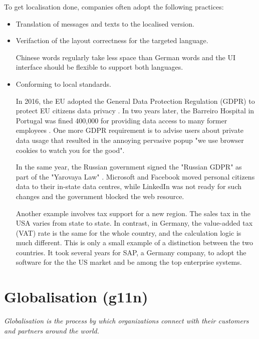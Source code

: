 To get localisation done, companies often adopt the following practices:
\begin{itemize}
  \item Translation of messages and texts to the localised version.
  \item Verifaction of the layout correctness for the targeted language.
  
  Chinese words regularly take less space than German words and the UI interface should be flexible to support both languages.

  \item Conforming to local standards.
  
  In 2016, the EU adopted the General Data Protection Regulation (GDPR) to protect EU citizens data privacy \cite{gdpr}. In two years later, the Barreiro Hospital in Portugal was fined 400,000 \EUR{} for providing data access to many former employees \cite{hospitalfinenews}.
  One more GDPR requirement is to advise users about private data usage that resulted in the annoying pervasive popup "we use browser cookies to watch you for the good".

  
  In the same year, the Russian government signed the "Russian GDPR" as part of the "Yarovaya Law" \cite{yarovayalaw} \cite{yarovayaicnl}. Microsoft and Facebook moved personal citizens data to their in-state data centres, while LinkedIn was not ready for such changes and the government blocked the web resource.

  Another example involves tax support for a new region. The sales tax in the USA varies from state to state. In contrast, in Germany, the value-added tax (VAT) rate is the same for the whole country, and the calculation logic is much different. This is only a small example of a distinction between the two countries. It took several years for SAP, a Germany company, to adopt the software for the the US market and be among the top enterprise systems.
\end{itemize}


\section{Globalisation (g11n)}

\textit{Globalisation is the process by which organizations connect with their customers and partners around the world.}


